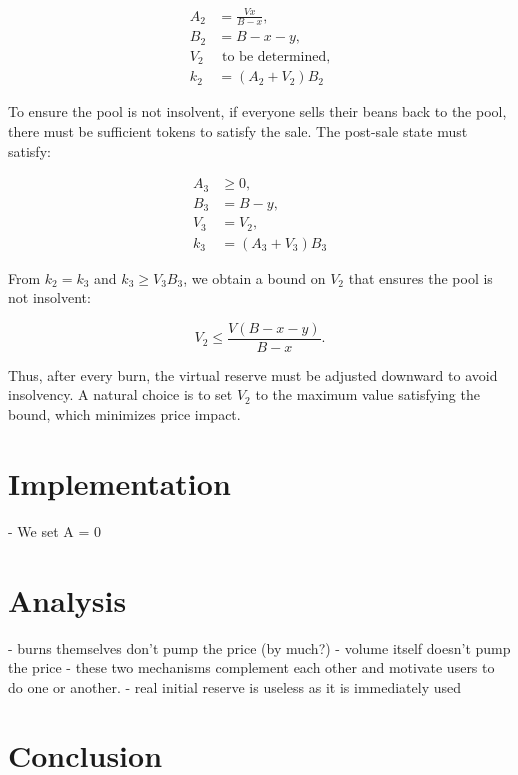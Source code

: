 \documentclass[11pt,a4paper]{article}
\theoremstyle{definition}
\begin{document}
\begin{align*}
    A_2 &= \frac{Vx}{B-x}, \\
    B_2 &= B - x - y, \\
    V_2 &\text{ to be determined}, \\
    k_2 &= (A_2+V_2)B_2
\end{align*}

To ensure the pool is not insolvent, if everyone sells their beans back to the pool, there must be sufficient tokens to satisfy the sale. The post-sale state must satisfy:

\begin{align*}
    A_3 &\geq 0, \\
    B_3 &= B - y, \\
    V_3 &= V_2, \\
    k_3 &= (A_3+V_3)B_3
\end{align*}

From $k_2 = k_3$ and $k_3 \geq V_3 B_3$, we obtain a bound on $V_2$ that ensures the pool is not insolvent:

\begin{equation}
    V_2 \leq \frac{V(B-x-y)}{B-x}.
\end{equation}

Thus, after every burn, the virtual reserve must be adjusted downward to avoid insolvency. A natural choice is to set $V_2$ to the maximum value satisfying the bound, which minimizes price impact.


\section{Implementation}
\label{sec:implementation}

- We set A = 0

\section{Analysis}
\label{sec:analysis}

- burns themselves don't pump the price (by much?)
- volume itself doesn't pump the price
- these two mechanisms complement each other and motivate users to do one or another.
- real initial reserve is useless as it is immediately used 


\section{Conclusion}
\label{sec:conclusion}
\end{document}

